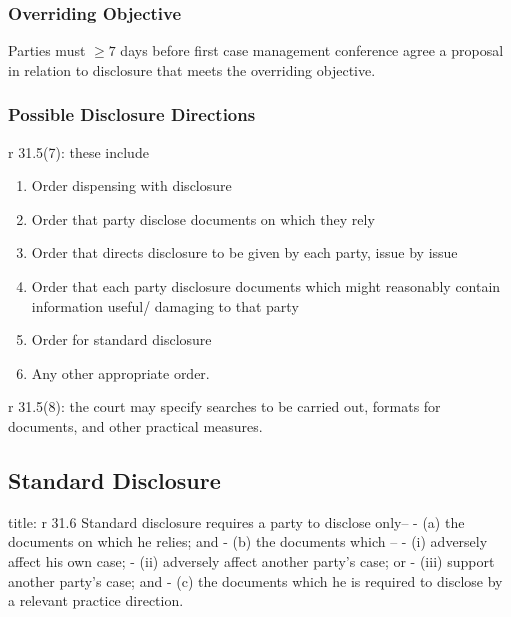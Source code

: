 \documentclass[
]{article}
\newenvironment{Shaded}{}{}
\newcommand{\NormalTok}[1]{#1}
\providecommand{\tightlist}{%
  \setlength{\itemsep}{0pt}\setlength{\parskip}{0pt}}
\begin{document}
\hypertarget{overriding-objective}{%
\subsubsection{Overriding Objective}\label{overriding-objective}}

Parties must \(\geq 7\) days before first case management conference
agree a proposal in relation to disclosure that meets the overriding
objective.

\hypertarget{possible-disclosure-directions}{%
\subsubsection{Possible Disclosure
Directions}\label{possible-disclosure-directions}}

r 31.5(7): these include

\begin{enumerate}
\def\labelenumi{\arabic{enumi}.}
\tightlist
\item
  Order dispensing with disclosure
\item
  Order that party disclose documents on which they rely
\item
  Order that directs disclosure to be given by each party, issue by
  issue
\item
  Order that each party disclosure documents which might reasonably
  contain information useful/ damaging to that party
\item
  Order for standard disclosure
\item
  Any other appropriate order.
\end{enumerate}

r 31.5(8): the court may specify searches to be carried out, formats for
documents, and other practical measures.

\hypertarget{standard-disclosure}{%
\subsection{Standard Disclosure}\label{standard-disclosure}}

\begin{Shaded}
\begin{Highlighting}[]
\NormalTok{title: r 31.6}
\NormalTok{Standard disclosure requires a party to disclose only–}
\NormalTok{{-} (a) the documents on which he relies; and}
\NormalTok{{-} (b) the documents which –}
\NormalTok{    {-} (i) adversely affect his own case;}
\NormalTok{    {-} (ii) adversely affect another party’s case; or}
\NormalTok{    {-} (iii) support another party’s case; and}
\NormalTok{{-} (c) the documents which he is required to disclose by a relevant practice direction.}
\end{Highlighting}
\end{Shaded}
\end{document}
